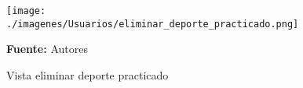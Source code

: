 \begin{figure}[!htb]
  \begin{center}
\texttt{[image: ./imagenes/Usuarios/eliminar\_deporte\_practicado.png]}
    \caption{Vista eliminar deporte practicado}
    \label{fig:Vista_eliminar_deporte_practicado}
    \textbf{Fuente:}  Autores
  \end{center}
\end{figure}
